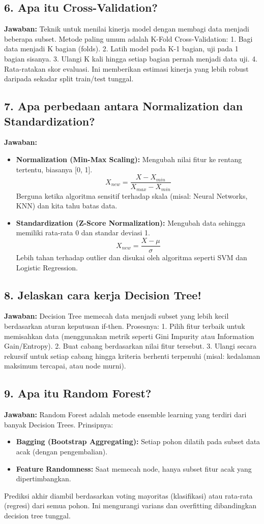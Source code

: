 \subsection{6. Apa itu Cross-Validation?}
\textbf{Jawaban:}
Teknik untuk menilai kinerja model dengan membagi data menjadi beberapa subset. Metode paling umum adalah K-Fold Cross-Validation:
1. Bagi data menjadi K bagian (folds).
2. Latih model pada K-1 bagian, uji pada 1 bagian sisanya.
3. Ulangi K kali hingga setiap bagian pernah menjadi data uji.
4. Rata-ratakan skor evaluasi.
Ini memberikan estimasi kinerja yang lebih robust daripada sekadar split train/test tunggal.

\subsection{7. Apa perbedaan antara Normalization dan Standardization?}
\textbf{Jawaban:}
\begin{itemize}
    \item \textbf{Normalization (Min-Max Scaling):} Mengubah nilai fitur ke rentang tertentu, biasanya [0, 1].
    \[ X_{new} = \frac{X - X_{min}}{X_{max} - X_{min}} \]
    Berguna ketika algoritma sensitif terhadap skala (misal: Neural Networks, KNN) dan kita tahu batas data.
    \item \textbf{Standardization (Z-Score Normalization):} Mengubah data sehingga memiliki rata-rata 0 dan standar deviasi 1.
    \[ X_{new} = \frac{X - \mu}{\sigma} \]
    Lebih tahan terhadap outlier dan disukai oleh algoritma seperti SVM dan Logistic Regression.
\end{itemize}

\subsection{8. Jelaskan cara kerja Decision Tree!}
\textbf{Jawaban:}
Decision Tree memecah data menjadi subset yang lebih kecil berdasarkan aturan keputusan if-then.
Prosesnya:
1. Pilih fitur terbaik untuk memisahkan data (menggunakan metrik seperti Gini Impurity atau Information Gain/Entropy).
2. Buat cabang berdasarkan nilai fitur tersebut.
3. Ulangi secara rekursif untuk setiap cabang hingga kriteria berhenti terpenuhi (misal: kedalaman maksimum tercapai, atau node murni).

\subsection{9. Apa itu Random Forest?}
\textbf{Jawaban:}
Random Forest adalah metode ensemble learning yang terdiri dari banyak Decision Trees.
Prinsipnya:
\begin{itemize}
    \item \textbf{Bagging (Bootstrap Aggregating):} Setiap pohon dilatih pada subset data acak (dengan pengembalian).
    \item \textbf{Feature Randomness:} Saat memecah node, hanya subset fitur acak yang dipertimbangkan.
\end{itemize}
Prediksi akhir diambil berdasarkan voting mayoritas (klasifikasi) atau rata-rata (regresi) dari semua pohon. Ini mengurangi varians dan overfitting dibandingkan decision tree tunggal.

